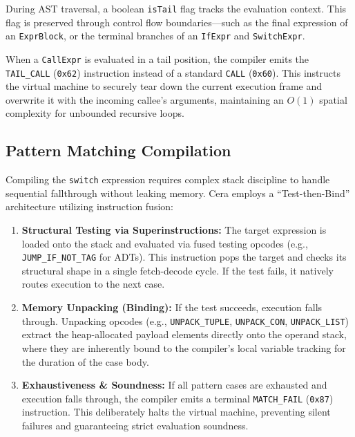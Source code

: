 \documentclass[11pt, a4paper]{article}
\begin{document}
During AST traversal, a boolean \texttt{isTail} flag tracks the evaluation context. This flag is preserved through control flow boundaries—such as the final expression of an \texttt{ExprBlock}, or the terminal branches of an \texttt{IfExpr} and \texttt{SwitchExpr}. 

When a \texttt{CallExpr} is evaluated in a tail position, the compiler emits the \texttt{TAIL\_CALL} (\texttt{0x62}) instruction instead of a standard \texttt{CALL} (\texttt{0x60}). This instructs the virtual machine to securely tear down the current execution frame and overwrite it with the incoming callee's arguments, maintaining an $O(1)$ spatial complexity for unbounded recursive loops.

\subsection{Pattern Matching Compilation}
Compiling the \texttt{switch} expression requires complex stack discipline to handle sequential fallthrough without leaking memory. Cera employs a ``Test-then-Bind'' architecture utilizing instruction fusion:

\begin{enumerate}
    \item \textbf{Structural Testing via Superinstructions:} The target expression is loaded onto the stack and evaluated via fused testing opcodes (e.g., \texttt{JUMP\_IF\_NOT\_TAG} for ADTs). This instruction pops the target and checks its structural shape in a single fetch-decode cycle. If the test fails, it natively routes execution to the next case.
    \item \textbf{Memory Unpacking (Binding):} If the test succeeds, execution falls through. Unpacking opcodes (e.g., \texttt{UNPACK\_TUPLE}, \texttt{UNPACK\_CON}, \texttt{UNPACK\_LIST}) extract the heap-allocated payload elements directly onto the operand stack, where they are inherently bound to the compiler's local variable tracking for the duration of the case body.
    \item \textbf{Exhaustiveness \& Soundness:} If all pattern cases are exhausted and execution falls through, the compiler emits a terminal \texttt{MATCH\_FAIL} (\texttt{0x87}) instruction. This deliberately halts the virtual machine, preventing silent failures and guaranteeing strict evaluation soundness.
\end{enumerate}
\end{document}
